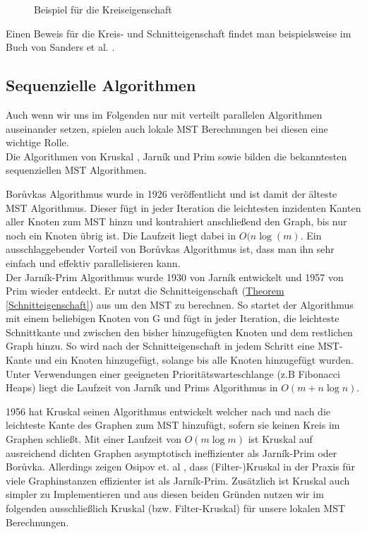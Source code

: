 \begin{figure}[H]
    \centering
    
    \caption{Beispiel für die Kreiseigenschaft}
    \label{Kreis-Img}
\end{figure}


Einen Beweis für die Kreis- und Schnitteigenschaft findet man beispielsweise im Buch von Sanders et al. \cite{sanders2019sequential}.



\subsection{Sequenzielle Algorithmen}
Auch wenn wir uns im Folgenden nur mit verteilt parallelen Algorithmen auseinander setzen, spielen auch lokale MST Berechnungen bei diesen eine wichtige Rolle.\\
Die Algorithmen von Kruskal \cite{kruskal1956shortest}, Jarník und Prim \cite{prim1957shortest} sowie \boruvka \cite{boruuvka1926jistem} bilden die bekanntesten sequenziellen MST Algorithmen.

Bor{\r u}vkas Algorithmus wurde in 1926 veröffentlicht und ist damit der älteste MST Algorithmus. Dieser fügt in jeder Iteration die leichtesten inzidenten Kanten aller Knoten zum MST hinzu und kontrahiert anschließend den Graph, bis nur noch ein Knoten übrig ist. Die Laufzeit liegt dabei in $O(n \log(m)$.
Ein ausschlaggebender Vorteil von Bor{\r u}vkas Algorithmus ist, dass man ihn sehr einfach und effektiv parallelisieren kann.\\

Der Jarník-Prim Algorithmus wurde 1930 von Jarník entwickelt und 1957 von Prim wieder entdeckt. Er nutzt die Schnitteigenschaft (\hyperref[Schnitteigenschaft]{Theorem} \ref{Schnitteigenschaft}) aus um den MST zu berechnen. So startet der Algorithmus mit einem beliebigen Knoten von G und fügt in jeder Iteration, die leichteste Schnittkante und zwischen den bisher hinzugefügten Knoten und dem restlichen Graph hinzu. So wird nach der Schnitteigenschaft in jedem Schritt eine MST-Kante und ein Knoten hinzugefügt, solange bis alle Knoten hinzugefügt wurden. Unter Verwendungen einer geeigneten Prioritätswarteschlange (z.B Fibonacci Heaps) liegt die Laufzeit von Jarník und Prims Algorithmus in $O(m+n\log n)$.

1956 hat Kruskal seinen Algorithmus entwickelt welcher nach und nach die leichteste Kante des Graphen zum MST hinzufügt, sofern sie keinen Kreis im Graphen schließt. 
Mit einer Laufzeit von $O(m\log m)$ ist Kruskal auf ausreichend dichten Graphen asymptotisch ineffizienter als Jarník-Prim oder Bor{\r u}vka. 
Allerdings zeigen Osipov et. al \cite{osipov2009filter}, dass (Filter-)Kruskal in der Praxis für viele Graphinstanzen effizienter ist als Jarník-Prim. 
Zusätzlich ist Kruskal auch simpler zu Implementieren und aus diesen beiden Gründen nutzen wir im folgenden ausschließlich Kruskal (bzw. Filter-Kruskal) für unsere lokalen MST Berechnungen.

